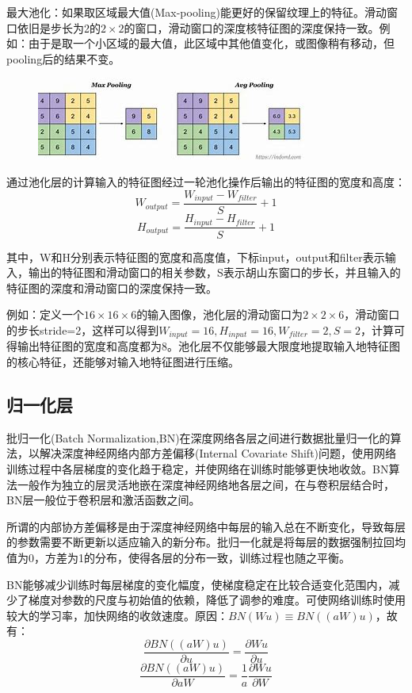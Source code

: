\documentclass[openbib]{article}
\begin{document}
最大池化：如果取区域最大值(Max-pooling)能更好的保留纹理上的特征。滑动窗口依旧是步长为2的$2\times2$的窗口，滑动窗口的深度核特征图的深度保持一致。例如：由于是取一个小区域的最大值，此区域中其他值变化，或图像稍有移动，但pooling后的结果不变。

\begin{figure}[htbp]
	\centering
	\includegraphics[scale=1]{4-4}
\end{figure}

通过池化层的计算输入的特征图经过一轮池化操作后输出的特征图的宽度和高度：
$$W_{output}=\frac{W_{input}-W_{filter}}{S}+1$$
$$H_{output}=\frac{H_{input}-H_{filter}}{S}+1$$

其中，W和H分别表示特征图的宽度和高度值，下标input，output和filter表示输入，输出的特征图和滑动窗口的相关参数，S表示胡山东窗口的步长，并且输入的特征图的深度和滑动窗口的深度保持一致。

例如：定义一个$16\times16\times6$的输入图像，池化层的滑动窗口为$2\times2\times6$，滑动窗口的步长stride=2，这样可以得到$W_{input}=16,H_{input}=16,W_{filter}=2,S=2$，计算可得输出特征图的宽度和高度都为8。池化层不仅能够最大限度地提取输入地特征图的核心特征，还能够对输入地特征图进行压缩。
\subsection{归一化层}
批归一化(Batch Normalization,BN)在深度网络各层之间进行数据批量归一化的算法，以解决深度神经网络内部方差偏移(Internal Covariate Shift)问题，使用网络训练过程中各层梯度的变化趋于稳定，并使网络在训练时能够更快地收敛。BN算法一般作为独立的层灵活地嵌在深度神经网络地各层之间，在与卷积层结合时，BN层一般位于卷积层和激活函数之间。

所谓的内部协方差偏移是由于深度神经网络中每层的输入总在不断变化，导致每层的参数需要不断更新以适应输入的新分布。批归一化就是将每层的数据强制拉回均值为0，方差为1的分布，使得各层的分布一致，训练过程也随之平衡。

BN能够减少训练时每层梯度的变化幅度，使梯度稳定在比较合适变化范围内，减少了梯度对参数的尺度与初始值的依赖，降低了调参的难度。可使网络训练时使用较大的学习率，加快网络的收敛速度。原因：$BN(Wu) \equiv BN((aW)u)$，故有：
$$\frac{\partial BN((aW)u)}{\partial u}=\frac{\partial Wu}{\partial u}$$
$$\frac{\partial BN((aW)u)}{\partial aW}=\frac{1}{a}\frac{\partial Wu}{\partial W}$$
\end{document}
